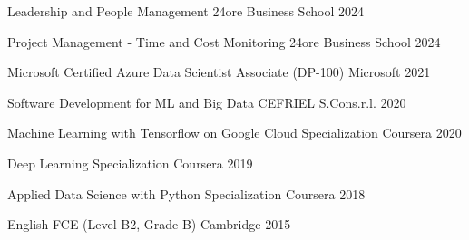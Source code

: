 

\begin{cvhonors}

  \cvhonor
    {Leadership and People Management } %
    {24ore Business School} %
    {} %
    {2024} %

  \cvhonor
    {Project Management - Time and Cost Monitoring} %
    {24ore Business School} %
    {} %
    {2024} %

  \cvhonor
    {Microsoft Certified Azure Data Scientist Associate (DP-100)} %
    {Microsoft} %
    {} %
    {2021} %

  \cvhonor
    {Software Development for ML and Big Data} %
    {CEFRIEL S.Cons.r.l.} %
    {} %
    {2020} %

  \cvhonor
    {Machine Learning with Tensorflow on Google Cloud Specialization} %
    {Coursera} %
    {} %
    {2020} %

  \cvhonor
    {Deep Learning Specialization} %
    {Coursera} %
    {} %
    {2019} %

  \cvhonor
    {Applied Data Science with Python Specialization} %
    {Coursera} %
    {} %
    {2018} %
    
  \cvhonor
    {English FCE (Level B2, Grade B)} %
    {Cambridge} %
    {} %
    {2015} %

\end{cvhonors}